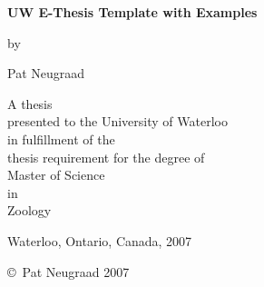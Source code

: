 \pagestyle{empty}

\begin{titlepage}
        \begin{center}
        \vspace*{1.0cm}

        \Huge
        {\bf UW E-Thesis Template with Examples}

        \vspace*{1.0cm}

        \normalsize
        by \\

        \vspace*{1.0cm}

        \Large
        Pat Neugraad \\

        \vspace*{3.0cm}

        \normalsize
        A thesis \\
        presented to the University of Waterloo \\ 
        in fulfillment of the \\
        thesis requirement for the degree of \\
        Master of Science \\
        in \\
        Zoology \\

        \vspace*{2.0cm}

        Waterloo, Ontario, Canada, 2007 \\

        \vspace*{1.0cm}

        \copyright\ Pat Neugraad 2007 \\
        \end{center}
\end{titlepage}

\pagestyle{plain}
\setcounter{page}{2}

